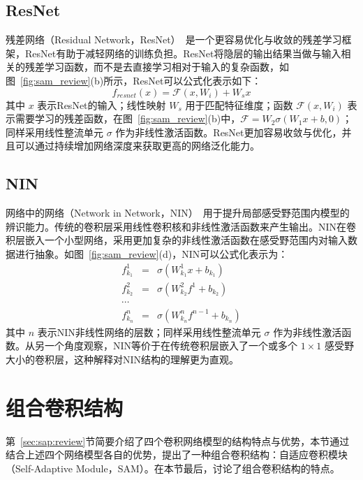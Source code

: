 \subsection{ResNet}
\label{sec:sap:review:resnet}

残差网络（Residual Network，ResNet）~\cite{he2015deep}是一个更容易优化与收敛的残差学习框架，ResNet有助于减轻网络的训练负担。ResNet将隐层的输出结果当做与输入相关的残差学习函数，而不是去直接学习相对于输入的复杂函数，如图~\ref{fig:sam_review}(b)所示，ResNet可以公式化表示如下：
\begin{equation} \label{equ:resnet}
f_{resnet}(x)=\mathcal{F}(x, W_i) + W_{s}x
\end{equation}
其中 $x$ 表示ResNet的输入；线性映射 $W_s$ 用于匹配特征维度；函数 $\mathcal{F}(x, W_i)$ 表示需要学习的残差函数，在图~\ref{fig:sam_review}(b)中，$\mathcal{F} = W_{2}\sigma(W_{1}x+b, 0)$；同样采用线性整流单元 $\sigma$ 作为非线性激活函数。ResNet更加容易收敛与优化，并且可以通过持续增加网络深度来获取更高的网络泛化能力。

\subsection{NIN}
\label{sec:sap:review:nin}

网络中的网络（Network in Network，NIN）~\cite{DBLP:journals/corr/LinCY13}用于提升局部感受野范围内模型的辨识能力。传统的卷积层采用线性卷积核和非线性激活函数来产生输出。NIN在卷积层嵌入一个小型网络，采用更加复杂的非线性激活函数在感受野范围内对输入数据进行抽象。如图~\ref{fig:sam_review}(d)，NIN可以公式化表示为：
\begin{eqnarray} \label{equ:nin}
f_{k_1}^{1}&=&\sigma(W_{k_1}^{1}x+b_{k_1}) \nonumber\\
f_{k_2}^{2}&=&\sigma(W_{k_2}^{2}f^{1}+b_{k_2}) \nonumber\\
\cdots&\nonumber\\
f_{k_n}^{n}&=&\sigma(W_{k_n}^{n}f^{n-1}+b_{k_n})
\end{eqnarray}
其中 $n$ 表示NIN非线性网络的层数；同样采用线性整流单元 $\sigma$ 作为非线性激活函数。从另一个角度观察，NIN等价于在传统卷积层嵌入了一个或多个 $1\times1$ 感受野大小的卷积层，这种解释对NIN结构的理解更为直观。

\section{组合卷积结构}
\label{sec:sap:model}

第~\ref{sec:sap:review}节简要介绍了四个卷积网络模型的结构特点与优势，本节通过结合上述四个网络模型各自的优势，提出了一种组合卷积结构：自适应卷积模块（Self-Adaptive Module，SAM）。在本节最后，讨论了组合卷积结构的特点。

